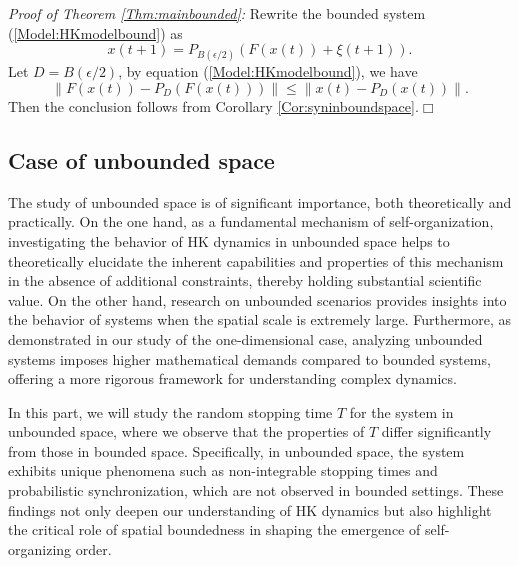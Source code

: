 \documentclass[11pt]{article}
\theoremstyle{definition}
\theoremstyle{remark}
\numberwithin{equation}{section}
\begin{document}
\emph{Proof of Theorem \ref{Thm:mainbounded}:}
Rewrite the bounded system (\ref{Model:HKmodelbound}) as
\begin{equation}\label{Model:HKboundrewrite}
  x(t+1)=P_{B(\epsilon/2)}(F(x(t))+\xi(t+1)).
\end{equation}
Let $D=B(\epsilon/2)$, by equation (\ref{Model:HKmodelbound}), we have
\begin{equation*}
  \|F(x(t))-P_D(F(x(t)))\|\leq \|x(t)-P_D(x(t))\|.
\end{equation*}
Then the conclusion follows from Corollary \ref{Cor:syninboundspace}.\hfill $\Box$

\subsection{Case of unbounded space}\label{Subsec:unboundedspace}
The study of unbounded space is of significant importance, both theoretically and practically. On the one hand, as a fundamental mechanism of self-organization, investigating the behavior of HK dynamics in unbounded space helps to theoretically elucidate the inherent capabilities and properties of this mechanism in the absence of additional constraints, thereby holding substantial scientific value. On the other hand, research on unbounded scenarios provides insights into the behavior of systems when the spatial scale is extremely large. Furthermore, as demonstrated in our study of the one-dimensional case, analyzing unbounded systems imposes higher mathematical demands compared to bounded systems, offering a more rigorous framework for understanding complex dynamics.

In this part, we will study the random stopping time $T$ for the system in unbounded space, where we observe that the properties of $T$ differ significantly from those in bounded space. Specifically, in unbounded space, the system exhibits unique phenomena such as non-integrable stopping times and probabilistic synchronization, which are not observed in bounded settings. These findings not only deepen our understanding of HK dynamics but also highlight the critical role of spatial boundedness in shaping the emergence of self-organizing order.
\end{document}
